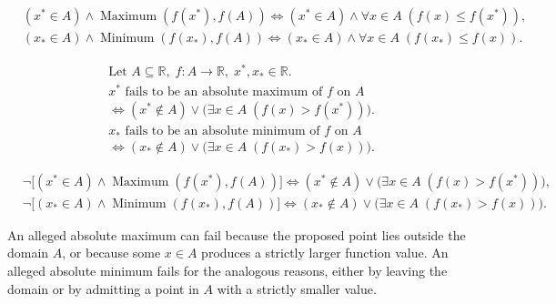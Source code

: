\begin{remark*}
\[
\begin{aligned}
&(x^{*} \in A) \land \operatorname{Maximum}(f(x^{*}), f(A))
\Longleftrightarrow (x^{*} \in A) \land \forall x \in A\; (f(x) \le f(x^{*})),\\
&(x_{*} \in A) \land \operatorname{Minimum}(f(x_{*}), f(A))
\Longleftrightarrow (x_{*} \in A) \land \forall x \in A\; (f(x_{*}) \le f(x)).
\end{aligned}
\]
\end{remark*}

\begin{remark*}
\[
\begin{aligned}
&\text{Let } A \subseteq \mathbb{R},\; f \colon A \to \mathbb{R},\; x^{*}, x_{*} \in \mathbb{R}.\\
&x^{*} \text{ fails to be an absolute maximum of } f \text{ on } A\\
&\Longleftrightarrow (x^{*} \notin A) \lor \bigl(\exists x \in A\; (f(x) > f(x^{*}))\bigr).\\
&x_{*} \text{ fails to be an absolute minimum of } f \text{ on } A\\
&\Longleftrightarrow (x_{*} \notin A) \lor \bigl(\exists x \in A\; (f(x_{*}) > f(x))\bigr).
\end{aligned}
\]
\end{remark*}

\begin{remark*}
\[
\begin{aligned}
&\neg\bigl[(x^{*} \in A) \land \operatorname{Maximum}(f(x^{*}), f(A))\bigr]
\Longleftrightarrow (x^{*} \notin A) \lor \bigl(\exists x \in A\; (f(x) > f(x^{*}))\bigr),\\
&\neg\bigl[(x_{*} \in A) \land \operatorname{Minimum}(f(x_{*}), f(A))\bigr]
\Longleftrightarrow (x_{*} \notin A) \lor \bigl(\exists x \in A\; (f(x_{*}) > f(x))\bigr).
\end{aligned}
\]
\end{remark*}

\begin{remark*}
An alleged absolute maximum can fail because the proposed point lies outside the domain $A$, or because some $x \in A$ produces a strictly larger function value. An alleged absolute minimum fails for the analogous reasons, either by leaving the domain or by admitting a point in $A$ with a strictly smaller value.
\end{remark*}

